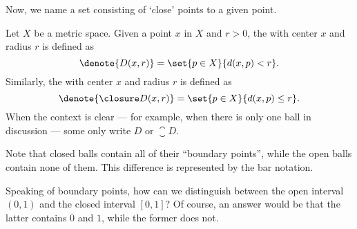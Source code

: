 Now, we name a set consisting of `close' points to a given point.

\begin{definition}[Balls]
    \label{def:ball}
    Let \(X\) be a metric space.
    Given a point \(x\) in \(X\) and \(r>0\),
    the  with center \(x\) and radius \(r\)
    is defined as
    \[
        \denote{D(x,r)}
        =\set{p\in X}{d(x,p)<r}.
    \]
    Similarly,
    the 
    with center \(x\) and radius \(r\)
    is defined as
    \[
        \denote{\closure D(x,r)}
        =\set{p\in X}{d(x,p)\le r}.
    \]
    When the context is clear
    ---
    for example, when there is only one ball in discussion
    ---
    some only write \(D\) or \(\closure D\).
\end{definition}

Note that closed balls contain all of their ``boundary points'',
while the open balls contain none of them.
This difference is represented by the bar notation.

Speaking of boundary points,
how can we distinguish between the open interval \((0,1)\)
and the closed interval \([0,1]\)?
Of course, an answer would be that
the latter contains \(0\) and \(1\),
while the former does not.